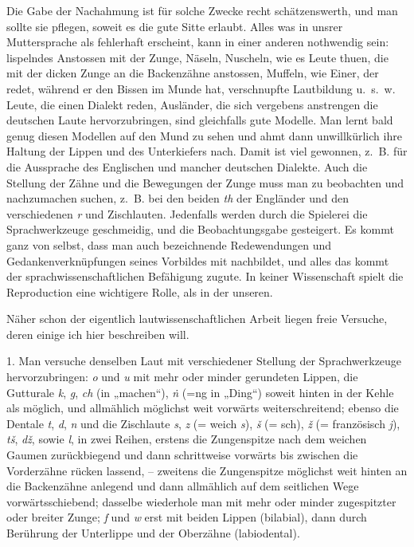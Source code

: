 Die Gabe der Nachahmung ist für solche Zwecke recht schätzenswerth, und man sollte sie pflegen, soweit es die gute Sitte erlaubt. Alles was in unsrer Muttersprache als fehlerhaft erscheint, kann in einer \label{fp.36} anderen nothwendig sein: lispelndes Anstossen mit der Zunge, Näseln, Nuscheln, wie es Leute thuen, die mit der dicken Zunge an die Backenzähne anstossen, Muffeln, wie Einer, der redet, während er den Bissen im Munde hat, verschnupfte Lautbildung u.~s.~w. Leute, die einen  Dialekt reden, Ausländer, die sich vergebens anstrengen die deutschen Laute hervorzubringen, sind gleichfalls gute Modelle. Man lernt bald genug diesen Modellen auf den Mund zu sehen und ahmt dann unwillkürlich ihre Haltung der Lippen und des Unterkiefers nach. Damit ist  viel gewonnen, z.~B. für die Aussprache des Englischen und mancher deutschen Dialekte. Auch die Stellung der Zähne und die Bewegungen der Zunge muss man zu beobachten und nachzumachen suchen, z.~B. bei den beiden \textit{th} der Engländer und den verschiedenen \textit{r} und Zischlauten. Jedenfalls werden durch die Spielerei die Sprachwerkzeuge geschmeidig, und die Beobachtungsgabe gesteigert. Es kommt ganz von selbst, dass man auch bezeichnende Redewendungen und Gedankenverknüpfungen seines Vorbildes mit nachbildet, und alles das kommt der sprachwissenschaftlichen Befähigung zugute. In keiner Wissenschaft spielt die Reproduction eine wichtigere Rolle, als in der unseren.

Näher schon der eigentlich lautwissenschaftlichen Arbeit liegen freie Versuche, deren einige ich hier beschreiben will.

1. Man versuche denselben Laut mit verschiedener Stellung der Sprachwerkzeuge hervorzubringen: \textit{o} und \textit{u} mit mehr oder minder gerundeten Lippen, die Gutturale \textit{k}, \textit{g}, \textit{ch} (in „machen“), \textit{ṅ} (=ng in „Ding“) soweit hinten in der Kehle als möglich, und allmählich möglichst weit vorwärts weiterschreitend; ebenso die Dentale \textit{t}, \textit{d}, \textit{n} und die Zischlaute \textit{s}, \textit{z} (= weich \textit{s}), \textit{š} (= sch), \textit{ž} (= französisch \textit{j}), \textit{tš}, \textit{dž}, sowie \textit{l}, in zwei Reihen, erstens die Zungenspitze nach dem weichen Gaumen zurückbiegend und dann schrittweise vorwärts bis zwischen die Vorderzähne rücken lassend, – zweitens die Zungenspitze möglichst weit hinten an die Backenzähne anlegend und dann allmählich auf dem seitlichen Wege vorwärtsschiebend; dasselbe wiederhole man mit mehr oder minder zugespitzter oder breiter Zunge; \textit{f} und \textit{w} erst mit beiden Lippen (bilabial), dann durch Berührung der Unterlippe und der Oberzähne (labiodental). 


